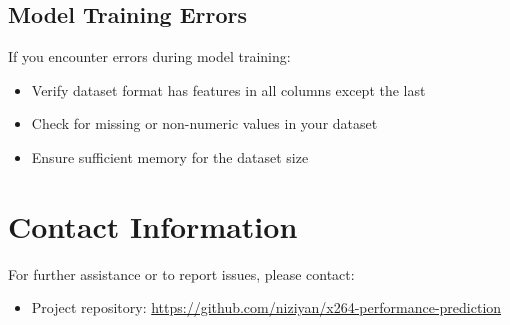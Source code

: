 \documentclass[10pt]{article}
\begin{document}
\subsection{Model Training Errors}
If you encounter errors during model training:
\begin{itemize}
    \item Verify dataset format has features in all columns except the last
    \item Check for missing or non-numeric values in your dataset
    \item Ensure sufficient memory for the dataset size
\end{itemize}

\section{Contact Information}
For further assistance or to report issues, please contact:
\begin{itemize}
    \item Project repository: \url{https://github.com/niziyan/x264-performance-prediction}
\end{itemize}
\end{document}
